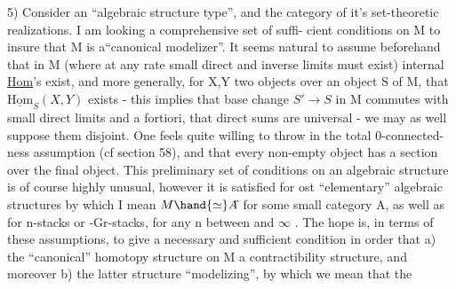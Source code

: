 5)   Consider an ``algebraic structure type'',  and the category  of  it's
set-theoretic realizations.  I am looking  a comprehensive set of suffi-%
cient conditions on M to insure that M is a``canonical modelizer''.   It seems
natural to assume beforehand that in M  (where at any rate small direct and
inverse limits must exist) internal \uline{Hom}'s exist,  and more generally,
for  X,Y two objects over an object S of M,  that $\underline{\mathrm{Hom}}_S(X,Y)$  exists  -
this implies that base change $S'\to S$ in M commutes with small direct limits
and a fortiori,  that direct sums are universal  -  we may as well suppose
them disjoint.  One feels quite willing to throw in the total 0-connected-%
ness assumption  (cf section 58),  and that every non-empty object has a
section over the final object.    This preliminary set of conditions on an
algebraic structure is of course highly unusual,  however it is satisfied
for ost ``elementary'' algebraic structures\deleted{,} \hand{(}by which I mean $M\hand{\simeq}A\hat{}$ for some
small category A\hand{)},  as well as for  n-stacks or \hand{$\infty$}-Gr-stacks,  for any n
between  and $\infty$ .  The hope  is,  in terms of these assumptions,  to
give a necessary and sufficient condition in order that  a)  the ``canonical''
homotopy structure  on M   a contractibility structure,  and moreover
b)  the latter structure  ``modelizing'',  by which we mean that the

